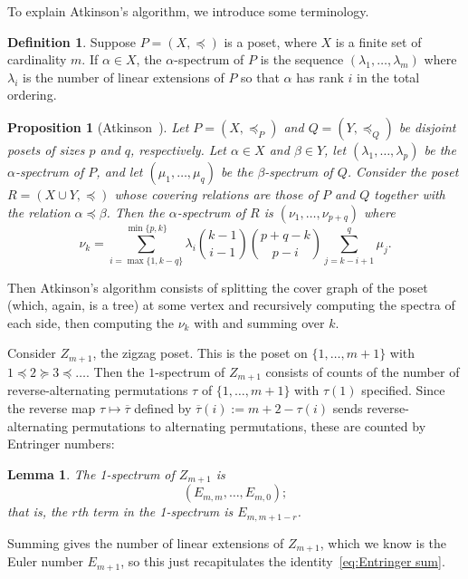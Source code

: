 \documentclass{article}
\newtheorem{lemma}[theorem]{Lemma}
\newtheorem{proposition}[theorem]{Proposition}
\theoremstyle{definition}
\newtheorem{definition}[theorem]{Definition}
\newcommand{\ent}[2]{E_{#1,#2}}
\begin{document}
To explain Atkinson's algorithm, we introduce some terminology.

\begin{definition}\label{def:spectrum}
	Suppose $P = (X,\preceq)$ is a poset, where $X$ is a finite set of cardinality $m$. If $\alpha \in X$, the $\alpha$-spectrum of $P$ is the sequence $(\lambda_1, \dots , \lambda_m)$ where $\lambda_i$ is the number of linear extensions of $P$ so that $\alpha$ has rank $i$ in the total ordering.
\end{definition}

\begin{proposition}[{Atkinson~\cite[Lemma~1]{atkinsonComputingNumberLinear1990}}]\label{prop:splitting}
	Let $P = (X, \preceq_P)$ and $Q = (Y, \preceq_Q)$ be disjoint posets of sizes $p$ and $q$, respectively. Let $\alpha \in X$ and $\beta \in Y$, let $(\lambda_1, \dots , \lambda_p)$ be the $\alpha$-spectrum of $P$, and let $(\mu_1, \dots , \mu_q)$ be the $\beta$-spectrum of $Q$. Consider the poset $R = (X \cup Y, \preceq)$ whose covering relations are those of $P$ and $Q$ together with the relation $\alpha \preceq \beta$. Then the $\alpha$-spectrum of $R$ is $(\nu_1, \dots , \nu_{p+q})$ where
	\[
		\nu_k = \sum_{i=\max\{1,k-q\}}^{\min\{p,k\}} \lambda_i \binom{k-1}{i-1}\binom{p+q-k}{p-i} \sum_{j=k-i+1}^q\mu_j.
	\]
\end{proposition}

Then Atkinson's algorithm consists of splitting the cover graph of the poset (which, again, is a tree) at some vertex and recursively computing the spectra of each side, then computing the $\nu_k$ with   and summing over $k$.

Consider $Z_{m+1}$, the zigzag poset. This is the poset on $\{1,\dots, m+1\}$ with $1 \preceq 2 \succeq 3 \preceq \dots$. Then the $1$-spectrum of $Z_{m+1}$ consists of counts of the number of reverse-alternating permutations $\tau$ of $\{1, \dots , m+1\}$ with $\tau(1)$ specified. Since the reverse map $\tau \mapsto \overline{\tau}$ defined by $\overline{\tau}(i) := m+2-\tau(i)$ sends reverse-alternating permutations to alternating permutations, these are counted by Entringer numbers:

\begin{lemma}\label{lem:zigzag 1-spectrum}
	The 1-spectrum of $Z_{m+1}$ is
	\[
		\left(\ent{m}{m}, \dots , \ent{m}{0}\right);
	\]
	that is, the $r$th term in the 1-spectrum is $\ent{m}{m+1-r}$.
\end{lemma}

Summing gives the number of linear extensions of $Z_{m+1}$, which we know is the Euler number $E_{m+1}$, so this just recapitulates the identity~\eqref{eq:Entringer sum}.
\end{document}
